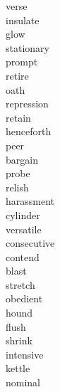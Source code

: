 \documentclass[a4paper, 11pt]{ctexart}
\begin{document}
\begin{multicols*}{3}
\begin{description}
\item[verse]

\item[insulate]

\item[glow]

\item[stationary]

\item[prompt]

\item[retire]

\item[oath]

\item[repression]

\item[retain]

\item[henceforth]

\item[peer]

\item[bargain]

\item[probe]

\item[relish]

\item[harassment]

\item[cylinder]

\item[versatile]

\item[consecutive]

\item[contend]

\item[blast]

\item[stretch]

\item[obedient]

\item[hound]

\item[flush]

\item[shrink]

\item[intensive]

\item[kettle]

\item[nominal]


\end{description}
\end{multicols*}
\end{document}
